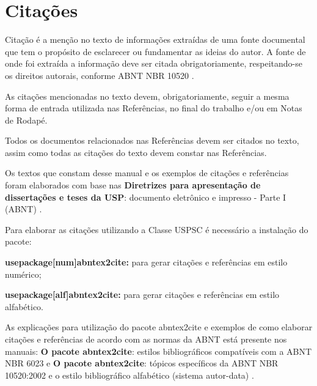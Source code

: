 

\chapter{Citações}

\label{ch: Estim}
Citação é a menção no texto de informações extraídas de uma fonte documental que tem o propósito de esclarecer ou fundamentar as ideias do autor. A fonte de onde foi extraída a informação deve ser citada obrigatoriamente, respeitando-se os direitos autorais, conforme ABNT NBR 10520 \cite{nbr10520}.

As citações mencionadas no texto devem, obrigatoriamente, seguir a mesma forma de entrada utilizada nas Referências, no final do trabalho e/ou em Notas de Rodapé.

Todos os documentos relacionados nas Referências devem ser citados no texto, assim como todas as citações do texto devem constar nas Referências. 

Os textos que constam desse manual e os exemplos de citações e referências foram elaborados com base nas \textbf{Diretrizes para apresentação de dissertações e teses da USP}: documento eletrônico e impresso - Parte I (ABNT) \cite{sibi2009}.

Para elaborar as citações utilizando a Classe USPSC é necessário a instalação do pacote: 

\begin{alineas}
	\item \textbf{usepackage[num]abntex2cite:} para gerar citações e referências em estilo numérico;
	\item \textbf{usepackage[alf]abntex2cite:} para gerar citações e referências em estilo alfabético.
\end{alineas}

As explicações para utilização do pacote abntex2cite e exemplos de como elaborar citações e referências de acordo com as normas da ABNT está presente nos manuais: \textbf{O pacote abntex2cite}: estilos bibliográficos compatíveis com a ABNT NBR 6023 \cite{abnetxcite} e  \textbf{O pacote abntex2cite}: tópicos específicos da ABNT NBR 10520:2002 e o estilo bibliográfico alfabético (sistema autor-data) \cite{abnetxcitealf}.


